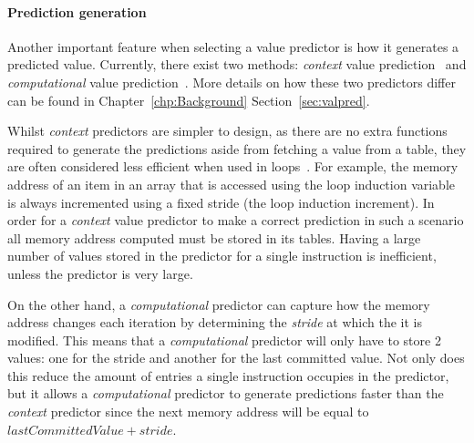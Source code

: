 \paragraph*{Prediction generation} Another important feature when selecting a value predictor is how it generates a predicted value.
Currently, there exist two methods: \textit{context} value prediction~\cite{peraisVTAGE2014} and \textit{computational} value prediction~\cite{peraisBeBop2015,gabbayVPOrig,goeman01dfcm}.
More details on how these two predictors differ can be found in Chapter~\ref{chp:Background} Section~\ref{sec:valpred}.

Whilst \textit{context} predictors are simpler to design, as there are no extra functions required to generate the predictions aside from fetching a value from a table, they are often considered less efficient when used in loops~\cite{peraisBeBop2015}.
For example, the memory address of an item in an array that is accessed using the loop induction variable is always incremented using a fixed stride (the loop induction increment).
In order for a \textit{context} value predictor to make a correct prediction in such a scenario all memory address computed must be stored in its tables.
Having a large number of values stored in the predictor for a single instruction is inefficient, unless the predictor is very large.

On the other hand, a \textit{computational} predictor can capture how the memory address changes each iteration by determining the \textit{stride} at which the it is modified.
This means that a \textit{computational} predictor will only have to store 2 values: one for the stride and another for the last committed value.
Not only does this reduce the amount of entries a single instruction occupies in the predictor, but it allows a \textit{computational} predictor to generate predictions faster than the \textit{context} predictor since the next memory address will be equal to $ lastCommittedValue + stride$.

